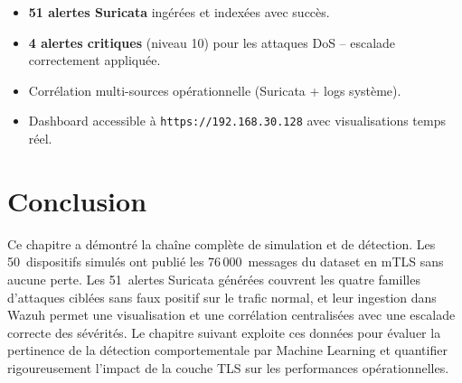 \begin{resultbox}
\begin{itemize}
  \item \textbf{51 alertes Suricata} ingérées et indexées avec succès.
  \item \textbf{4 alertes critiques} (niveau 10) pour les attaques DoS -- escalade correctement appliquée.
  \item Corrélation multi-sources opérationnelle (Suricata + logs système).
  \item Dashboard accessible à \texttt{https://192.168.30.128} avec visualisations temps réel.
\end{itemize}
\end{resultbox}

\section{Conclusion}

Ce chapitre a démontré la chaîne complète de simulation et de détection. Les 50~dispositifs simulés ont publié les 76\,000~messages du dataset en mTLS sans aucune perte. Les 51~alertes Suricata générées couvrent les quatre familles d'attaques ciblées sans faux positif sur le trafic normal, et leur ingestion dans Wazuh permet une visualisation et une corrélation centralisées avec une escalade correcte des sévérités. Le chapitre suivant exploite ces données pour évaluer la pertinence de la détection comportementale par Machine Learning et quantifier rigoureusement l'impact de la couche TLS sur les performances opérationnelles.
